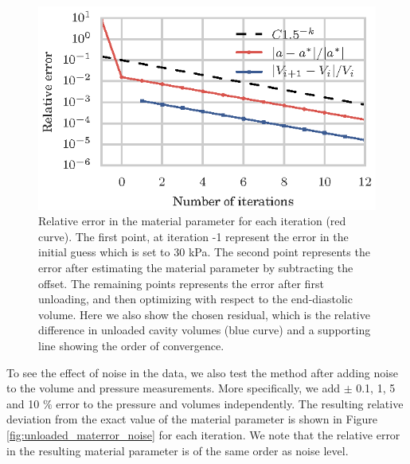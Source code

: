 \begin{figure}[htbp]
  \centering
  \includegraphics{figures/materror}
  \caption{\label{fig:unloaded_materror}Relative error in the material parameter for each iteration
  (red curve). The first point, at iteration -1 represent the error in
  the initial guess which is set to 30 kPa. The second point
  represents the error after estimating the material parameter by
  subtracting the offset. The remaining points represents the error
  after first unloading, and then optimizing with respect to the
  end-diastolic volume. Here we also show the chosen residual, which
  is the relative difference in unloaded cavity volumes (blue curve) and a
  supporting line showing the order of convergence. }
\end{figure}

To see the effect of noise in the data, we also test the method after
adding noise to the volume and pressure measurements. More specifically, we add
$\pm$ 0.1, 1, 5 and 10 $\%$ error to the pressure and volumes
independently. The resulting relative deviation from the exact value of the
material parameter is shown in Figure
\ref{fig:unloaded_materror_noise} for each iteration. We note that the
relative error in the resulting material parameter is of the same
order as noise level.


